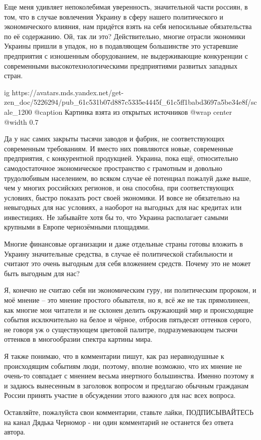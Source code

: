 Еще меня удивляет непоколебимая уверенность, значительной части россиян, в том,
что в случае вовлечения Украину в сферу нашего политического и экономического
влияния, нам придётся взять на себя непосильные обязательства по её содержанию.
Ой, так ли это? Действительно, многие отрасли экономики Украины пришли в
упадок, но в подавляющем большинстве это устаревшие предприятия с изношенным
оборудованием, не выдерживающие конкуренции с современными
высокотехнологическими предприятиями развитых западных стран.

\ifcmt
  ig https://avatars.mds.yandex.net/get-zen_doc/5226294/pub_61c531b07d887c5335e4445f_61c5ff1babd3697a5be34e8f/scale_1200
	@caption Картинка взята из открытых источников
	@wrap center
	@width 0.7
\fi

Да у нас самих закрыты тысячи заводов и фабрик, не соответствующих современным
требованиям. И вместо них появляются новые, современные предприятия, с
конкурентной продукцией. Украина, пока ещё, относительно самодостаточное
экономическое пространство с грамотным и довольно трудолюбивым населением, во
всяком случае её потенциал пожалуй даже выше, чем у многих российских регионов,
и она способна, при соответствующих условиях, быстро показать рост своей
экономики. И вовсе не обязательно на невыгодных для нас условиях, а наоборот на
выгодных для нас кредитах или инвестициях. Не забывайте хотя бы то, что Украина
располагает самыми крупными в Европе чернозёмными площадями.

Многие финансовые организации и даже отдельные страны готовы вложить в Украину
значительные средства, в случае её политической стабильности и считают это
очень выгодным для себя вложением средств. Почему это не может быть выгодным
для нас?

Я, конечно не считаю себя ни экономическим гуру, ни политическим пророком, и
моё мнение – это мнение простого обывателя, но я, всё же не так прямолинеен,
как многие мои читатели и не склонен делить окружающий мир и происходящие
события исключительно на белое и чёрное, отбросив пятьдесят оттенков серого, не
говоря уж о существующем цветовой палитре, подразумевающем тысячи оттенков в
многообразии спектра картины мира.

Я также понимаю, что в комментарии пишут, как раз неравнодушные к происходящим
событиям люди, поэтому, вполне возможно, что их мнение не очень-то совпадает с
мнением весьма инертного большинства. Именно поэтому я и задаюсь вынесенным в
заголовок вопросом и предлагаю обычным гражданам России принять участие в
обсуждении этого важного для нас всех вопроса.

Оставляйте, пожалуйста свои комментарии, ставьте лайки, ПОДПИСЫВАЙТЕСЬ на канал
Дядька Черномор - ни один комментарий не останется без ответа автора.

